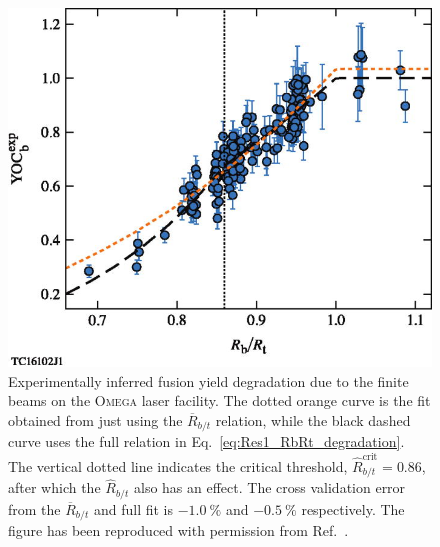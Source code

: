 \begin{figure}[t!]
    \includegraphics[width=0.7\linewidth]{Results1/Images/RbRt_degradation_Lees.jpeg}
    \centering
    \caption{Experimentally inferred fusion yield degradation due to the finite beams on the \textsc{Omega} laser facility.
    The dotted orange curve is the fit obtained from just using the $\overline{R}_{b/t}$ relation, while the black dashed curve uses the full relation in Eq.~\ref{eq:Res1_RbRt_degradation}.
    The vertical dotted line indicates the critical threshold, $\hat{R}_{b/t}^{\text{crit}}=0.86$, after which the $\hat{R}_{b/t}$ also has an effect.
    The cross validation error from the $\overline{R}_{b/t}$ and full fit is $-1.0\ \%$ and $-0.5\ \%$ respectively.
    The figure has been reproduced with permission from Ref.~\cite{lees_understanding_2023}.}%
    \label{fig:RbRt_YOC_lees}
\end{figure}

